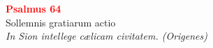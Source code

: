 


\def\greinitialformat#1{%
{\fontsize{39}{39}\selectfont #1}%
}




\vspace{0.3cm}
\begin{center}
 \textcolor{red}{\large \bf Psalmus 64}\\
Sollemnis gratiarum actio\\
\textit{\small In Sion intellege cælicam civitatem. (Origenes)}
\end{center}
